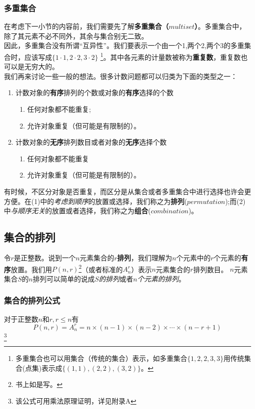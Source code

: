 \documentclass{ctexart}
\begin{document}
    \subsubsection*{多重集合}在考虑下一小节的内容前，我们需要先了解\textbf{多重集合（$multiset$）}。多重集合中，除了其元素不必不同外，其余与集合别无二致。\\
    因此，多重集合没有所谓“互异性”。我们要表示一个由一个1,两个2,两个3的多重集合时，应该写成$\{1\cdot 1, 2 \cdot 2 , 3 \cdot 2\}$
    \footnote{多重集合也可以用集合（传统的集合）表示，如多重集合$\{1,2,2,3,3\}$用传统集合(点集)表示成$\{(1,1),(2,2),(3,2)\}$。}。其中各元素的计量数被称为\textbf{重复数}，重复数也可以是无穷大的。\\
    我们再来讨论一些一般的想法。很多计数问题都可以归类为下面的类型之一：
    \begin{enumerate}
        \item 计数对象的\textbf{有序}排列的个数或对象的\textbf{有序}选择的个数 \begin{enumerate}
            \item 任何对象都不能重复;
            \item 允许对象重复（但可能是有限制的）。
        \end{enumerate}
        \item 计数对象的\textbf{无序}排列数目或者对象的\textbf{无序}选择个数\begin{enumerate}
            \item 任何对象都不能重复
            \item 允许对象重复（但可能是有限制的）。
        \end{enumerate}
    \end{enumerate}
    有时候，不区分对象是否重复，而区分是从集合或者多重集合中进行选择也许会更方便。在(1)中的\textit{考虑到顺序}的放置或选择，我们称之为\textbf{排列}($permutation$);而(2)中\textit{与顺序无关}的放置或者选择，我们称之为\textbf{组合}($combination$)。
    \subsection{集合的排列}
    令$r$是正整数。说到一个$n$元素集合的$r$\textbf{排列}，我们理解为$n$个元素中的$r$个元素的\textbf{有序}放置。我们用$P(n,r)$\footnote{书上如是写。}（或者标准的$A_n^r$）表示$n$元素集合的$r$排列数目。
    $n$元素集合$S$的$n$排列可以简单的说成\textit{$S$的排列}或者\textit{$n$个元素的排列}。
    \subsubsection{集合的排列公式}
    对于正整数$n$和$r,r \leq n$有
    \[P(n,r) = A_n^r = n \times (n -1 ) \times (n-2) \times \cdots \times (n -r +1)\]
    \footnote{该公式可用乘法原理证明，详见附录A}
\end{document}
